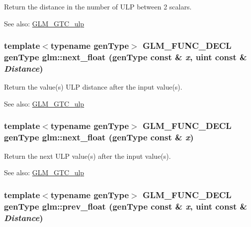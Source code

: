 Return the distance in the number of ULP between 2 scalars. \begin{Desc}
\item[See also:]\hyperlink{group__gtc__ulp}{GLM\_\-GTC\_\-ulp} \end{Desc}
\hypertarget{group__gtc__ulp_g686013928fd7c76c5f100b84483b1f51}{
\subsubsection[next\_\-float]{\setlength{\rightskip}{0pt plus 5cm}template$<$typename genType$>$ GLM\_\-FUNC\_\-DECL genType glm::next\_\-float (genType const \& {\em x}, \/  uint const \& {\em Distance})}}
\label{group__gtc__ulp_g686013928fd7c76c5f100b84483b1f51}


Return the value(s) ULP distance after the input value(s). \begin{Desc}
\item[See also:]\hyperlink{group__gtc__ulp}{GLM\_\-GTC\_\-ulp} \end{Desc}
\hypertarget{group__gtc__ulp_g5ec4457d254b7b960db32f10d219fd6f}{
\subsubsection[next\_\-float]{\setlength{\rightskip}{0pt plus 5cm}template$<$typename genType$>$ GLM\_\-FUNC\_\-DECL genType glm::next\_\-float (genType const \& {\em x})}}
\label{group__gtc__ulp_g5ec4457d254b7b960db32f10d219fd6f}


Return the next ULP value(s) after the input value(s). \begin{Desc}
\item[See also:]\hyperlink{group__gtc__ulp}{GLM\_\-GTC\_\-ulp} \end{Desc}
\hypertarget{group__gtc__ulp_ge55d449df292398361ccecad1cc5ead4}{
\subsubsection[prev\_\-float]{\setlength{\rightskip}{0pt plus 5cm}template$<$typename genType$>$ GLM\_\-FUNC\_\-DECL genType glm::prev\_\-float (genType const \& {\em x}, \/  uint const \& {\em Distance})}}
\label{group__gtc__ulp_ge55d449df292398361ccecad1cc5ead4}


